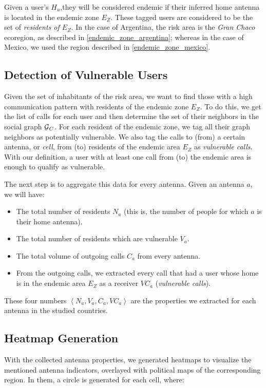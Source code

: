 Given a user's $H_u$,they will be considered endemic if their inferred home antenna is located in the endemic zone $E_Z$.
These tagged users are considered to be the set of \textit{residents of $E_Z$}.
In the case of Argentina, the risk area is the \textit{Gran Chaco} ecoregion, as described in \cref{endemic_zone_argentina};
whereas in the case of Mexico, we used the region described in \cref{endemic_zone_mexico}.


\subsection{Detection of Vulnerable Users}\label{subsection:vulnerable_users_detection}

Given the set of inhabitants of the risk area, we want to find those with a high communication pattern with residents of the endemic zone $E_Z$.
To do this, we get the list of calls for each user and then determine the set of their neighbors in the social graph $\operatorname{\mathcal{G}}_C$.
For each resident of the endemic zone, we tag all their graph neighbors as potentially vulnerable.
We also tag the calls to (from) a certain antenna, or \textit{cell}, from (to) residents of the endemic area $E_Z$ as \textit{vulnerable calls}.
With our definition, a user with at least one call from (to) the endemic area is enough to qualify as vulnerable.

The next step is to aggregate this data for every antenna.
Given an antenna $a$, we will have:
\begin{itemize}
	\item The total number of residents $N_a$ (this is, the number of people for which $a$ is their home antenna).
	\item The total number of residents which are vulnerable $V_a$.
	\item The total volume of outgoing calls $C_a$ from every antenna.
	\item From the outgoing calls, we extracted every call that had a user whose home is in the endemic area $E_Z$ as a receiver $VC_a$ (\textit{vulnerable calls}).
\end{itemize}

These four numbers $\left< N_a, V_a, C_a, VC_a \right>$ are the properties we extracted for each antenna in the studied countries.

\subsection{Heatmap Generation}
With the collected antenna properties, we generated heatmaps to visualize the mentioned antenna indicators, overlayed with political maps of the corresponding region.
In them, a circle is generated for each cell, where:

